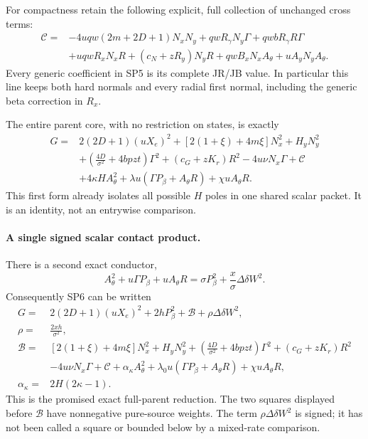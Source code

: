 For compactness retain the following explicit, full collection of
unchanged cross terms:
\begin{align*}
 \mathscr C={}&-4uqw(2m+2D+1)N_xN_y
 +qwR_\gamma N_y\Gamma+qwbR_\gamma R\Gamma\\
 &+uqwR_xN_xR+(c_N+zR_y)N_yR
 +qwB_xN_xA_\theta+uA_yN_yA_\theta.
 \tag{SP5}
\end{align*}
Every generic coefficient in SP5 is its complete JR/JB value. In
particular this line keeps both hard normals and every radial first
normal, including the generic beta correction in $R_x$.

The entire parent core, with no restriction on states, is exactly
\begin{align*}
G={}&2(2D+1)(uX_e)^2
 +[2(1+\xi)+4m\xi]N_x^2+H_yN_y^2\\
 &+\left(\frac{4D}{\sigma^2}+4bpzt\right)\Gamma^2
 +(c_G+zK_r)R^2-4u\nu N_x\Gamma+\mathscr C\\
 &+4\kappa H A_\theta^2
 +\lambda u(\Gamma P_\beta+A_\theta R)
 +\chi uA_\theta R.
 \tag{SP6}
\end{align*}
This first form already isolates all possible $H$ poles in one
shared scalar packet. It is an identity, not an entrywise comparison.

\paragraph{A single signed scalar contact product.}
There is a second exact conductor,
\[
 A_\theta^2+u\Gamma P_\beta+uA_\theta R
 =\sigma P_\beta^2+
       \frac{x}{\sigma}\Delta\delta W^2.
 \tag{SP7}
\]
Consequently SP6 can be written
\begin{align*}
 G={}&2(2D+1)(uX_e)^2+2hP_\beta^2+\mathscr B
               +\rho\Delta\delta W^2,\\
 \rho={}&\frac{2xh}{\sigma^2},\\
 \mathscr B={}&[2(1+\xi)+4m\xi]N_x^2+H_yN_y^2
 +\left(\frac{4D}{\sigma^2}+4bpzt\right)\Gamma^2
 +(c_G+zK_r)R^2\\
 &-4u\nu N_x\Gamma+\mathscr C+\alpha_\kappa A_\theta^2
 +\lambda_0u(\Gamma P_\beta+A_\theta R)+\chi uA_\theta R,\\
 \alpha_\kappa={}&2H(2\kappa-1).
 \tag{SP8}
\end{align*}
This is the promised exact full-parent reduction. The two squares
displayed before $\mathscr B$ have nonnegative pure-source weights.
The term $\rho\Delta\delta W^2$ is signed; it has not been called a
square or bounded below by a mixed-rate comparison.

